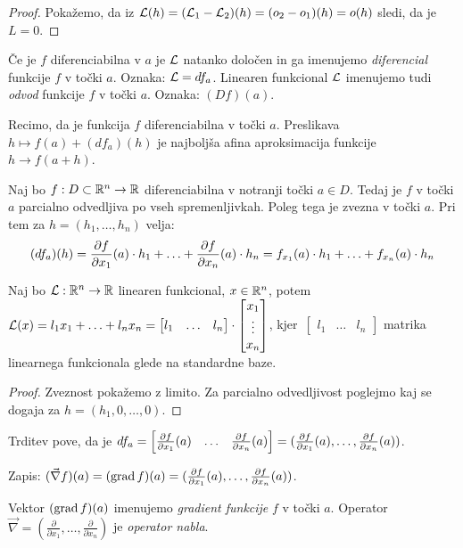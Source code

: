 \begin{proof}
    Pokažemo, da iz $\mathcal{L}(h) = (\mathcal{L}_1 - \mathcal{L}_2)(h) = (o_2 - o_1)(h) = o(h)$ sledi, da je $L = 0$.
\end{proof}

\begin{definicija}
    Če je $f$ diferenciabilna v $a$ je $\mathcal{L}$ natanko določen in ga imenujemo \emph{diferencial} funkcije $f$ v točki $a$. Oznaka: $\mathcal{L} = df_a$. Linearen funkcional $\mathcal{L}$ imenujemo tudi \emph{odvod} funkcije $f$ v točki $a$. Oznaka: $(Df)(a)$.
\end{definicija}

\begin{opomba}
    Recimo, da je funkcija $f$ diferenciabilna v točki $a$. Preslikava $h \mapsto f(a) + (df_a)(h)$ je najboljša afina aproksimacija funkcije $h \to f(a+h)$.
\end{opomba}

\begin{trditev}
    Naj bo $f: D \subset \mathbb{R}^n \to \mathbb{R}$ diferenciabilna v notranji točki $a \in D$. Tedaj je $f$ v točki $a$ parcialno odvedljiva po vseh spremenljivkah. Poleg tega je zvezna v točki $a$. Pri tem za $h = (h_1, \ldots, h_n)$ velja:
    $$(df_a)(h) = \frac{\partial f}{\partial x_1}(a) \cdot h_1 + \ldots + \frac{\partial f}{\partial x_n}(a) \cdot h_n = f_{x_1}(a) \cdot h_1 + \ldots + f_{x_n}(a) \cdot h_n$$
\end{trditev}

\begin{opomba}
    Naj bo $\mathcal{L}: \mathbb{R}^n \to \mathbb{R}$ linearen funkcional, $x \in \mathbb{R}^n$, potem $\mathcal{L}(x) = l_1x_1+\ldots+l_nx_n = \begin{bmatrix}
        l_1 & \ldots & l_n
    \end{bmatrix} \cdot \begin{bmatrix}
        x_1 \\ \vdots \\ x_n
    \end{bmatrix}$, kjer~$\begin{bmatrix}
        l_1 & \ldots & l_n
    \end{bmatrix}$ matrika linearnega funkcionala glede na standardne baze.    
\end{opomba}

\begin{proof}
    Zveznost pokažemo z limito. Za parcialno odvedljivost poglejmo kaj se dogaja za $h = (h_1, 0, \ldots, 0)$.
\end{proof}

\begin{opomba}
    Trditev pove, da je $df_a = \begin{bmatrix}
        \frac{\partial f}{\partial x_1}(a) & \ldots & \frac{\partial f}{\partial x_n}(a) 
    \end{bmatrix} = (\frac{\partial f}{\partial x_1}(a), \ldots, \frac{\partial f}{\partial x_n}(a))$.

    Zapis: $(\vec{\nabla} f) (a) = (\operatorname{grad} f)(a) = (\frac{\partial f}{\partial x_1}(a), \ldots, \frac{\partial f}{\partial x_n}(a))$.

    Vektor $(\operatorname{grad} f)(a)$ imenujemo \emph{gradient funkcije} $f$ v točki $a$. Operator $\vec{\nabla} = (\frac{\partial}{\partial x_1}, \ldots, \frac{\partial}{\partial x_n})$ je \emph{operator nabla}.
\end{opomba}

